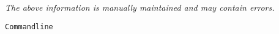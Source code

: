 \label{pkg:commandline}

{\tiny \it The above information is manually maintained and may contain errors.}
\begin{verbatim}
Commandline
\end{verbatim}
